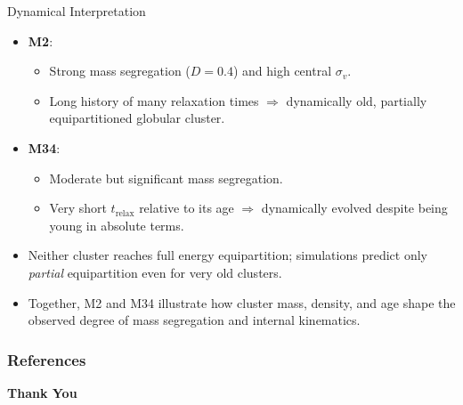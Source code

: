 \documentclass{beamer}
\begin{document}
\begin{frame}{Dynamical Interpretation}
    \begin{itemize}
        \item \textbf{M2}:
        \begin{itemize}
            \item Strong mass segregation ($D=0.4$) and high central $\sigma_v$.
            \item Long history of many relaxation times $\Rightarrow$ dynamically old, partially equipartitioned globular cluster.
        \end{itemize}
        \item \textbf{M34}:
        \begin{itemize}
            \item Moderate but significant mass segregation.
            \item Very short $t_{\mathrm{relax}}$ relative to its age $\Rightarrow$ dynamically evolved despite being young in absolute terms.
        \end{itemize}
        \item Neither cluster reaches full energy equipartition; simulations predict only \emph{partial} equipartition even for very old clusters.
        \item Together, M2 and M34 illustrate how cluster mass, density, and age shape the observed degree of mass segregation and internal kinematics.
    \end{itemize}
\end{frame}





\begin{frame}[fragile]
    \frametitle{References}
    \footnotesize
    
    
\end{frame}

\begin{frame}
    \Huge{\centerline{\textbf{Thank You}}}
\end{frame}

\end{document}
